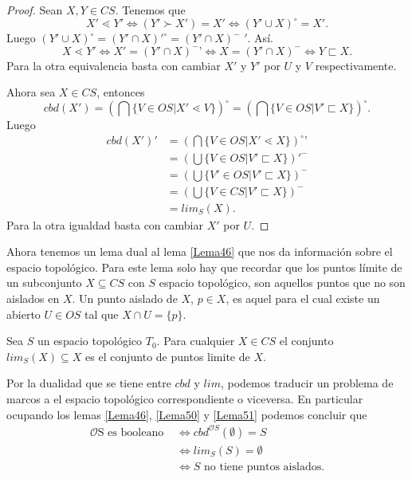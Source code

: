 \begin{proof}
Sean $X, Y\in CS$. Tenemos que $$X'\lessdot Y'\Leftrightarrow (Y'\succ X')=X'\Leftrightarrow (Y'\cup X)^\circ=X'.$$
Luego $(Y'\cup X)^\circ=(Y'\cap X)'^\circ =(Y'\cap X)^-$ $'$. Así. $$X\lessdot Y'\Leftrightarrow X'=(Y'\cap X)^-\mbox{'}\Leftrightarrow X=(Y'\cap X)^-\Leftrightarrow Y\sqsubset X.$$
Para la otra equivalencia basta con cambiar $X'$ y $Y'$ por $U$ y $V$ respectivamente.

Ahora sea $X\in CS$, entonces $$cbd(X')=\left(\bigcap\{V\in OS| X'\lessdot V\}\right)^\circ=\left(\bigcap\{V\in OS|V'\sqsubset X\}\right)^\circ.$$
Luego 
\begin{equation*}
\begin{split}
cbd(X')' &=\left(\bigcap\{V\in OS| X'\lessdot X\}\right)^\circ \mbox{'}\\
& =\left(\bigcup\{V\in OS|V'\sqsubset X\}\right)'^-\\
& =\left(\bigcup\{V'\in OS|V'\sqsubset X\}\right)^-\\
& =\left(\bigcup\{V\in CS|V'\sqsubset X\}\right)^-\\
& =lim_S(X).
\end{split}
\end{equation*}
Para la otra igualdad basta con cambiar $X'$ por $U$.
\end{proof}

Ahora tenemos un lema dual al lema \ref{Lema46} que nos da información sobre el espacio topológico. Para este lema solo hay que recordar que los puntos límite de un subconjunto $X\subseteq CS$ con $S$ espacio topológico, son aquellos puntos que no son aislados en $X$. Un punto aislado de $X$, $p\in X$, es aquel para el cual existe un abierto $U\in OS$ tal que $X\cap U=\{p\}$.

\begin{lemma}\label{Lema51}
Sea $S$ un espacio topológico $T_0$. Para cualquier $X\in CS$ el conjunto $lim_S(X)\subseteq X$ es el conjunto de puntos limite de $X$.
\end{lemma}

Por la dualidad que se tiene entre $cbd$ y $lim$, podemos traducir un problema de marcos a el espacio topológico correspondiente o viceversa. En particular ocupando los lemas \ref{Lema46}, \ref{Lema50} y \ref{Lema51} podemos concluir que 
\begin{equation*}
\begin{split}
\mathcal{O}\mbox{S es booleano } & \Leftrightarrow cbd^{\mathcal{O}S}(\emptyset)=S\\
& \Leftrightarrow lim_S(S)=\emptyset\\
& \Leftrightarrow S \mbox{ no tiene puntos aislados}.
\end{split}
\end{equation*}

